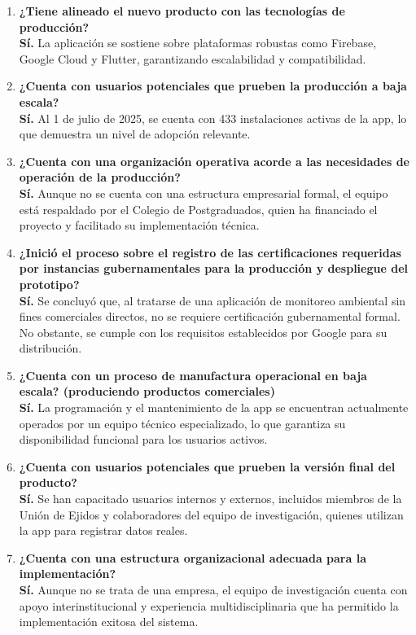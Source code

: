 \begin{enumerate}
\item \textbf{¿Tiene alineado el nuevo producto con las tecnologías de producción?} \\
\textbf{Sí.} La aplicación se sostiene sobre plataformas robustas como Firebase, Google Cloud y Flutter, garantizando escalabilidad y compatibilidad.

\item \textbf{¿Cuenta con usuarios potenciales que prueben la producción a baja escala?} \\
\textbf{Sí.} Al 1 de julio de 2025, se cuenta con 433 instalaciones activas de la app, lo que demuestra un nivel de adopción relevante.

\item \textbf{¿Cuenta con una organización operativa acorde a las necesidades de operación de la producción?} \\
\textbf{Sí.} Aunque no se cuenta con una estructura empresarial formal, el equipo está respaldado por el Colegio de Postgraduados, quien ha financiado el proyecto y facilitado su implementación técnica.
 

\item \textbf{¿Inició el proceso sobre el registro de las certificaciones requeridas por instancias gubernamentales para la producción y despliegue del prototipo?} \\
\textbf{Sí.} Se concluyó que, al tratarse de una aplicación de monitoreo ambiental sin fines comerciales directos, no se requiere certificación gubernamental formal. No obstante, se cumple con los requisitos establecidos por Google para su distribución.

\item \textbf{¿Cuenta con un proceso de manufactura operacional en baja escala? (produciendo productos comerciales)} \\
\textbf{Sí.} La programación y el mantenimiento de la app se encuentran actualmente operados por un equipo técnico especializado, lo que garantiza su disponibilidad funcional para los usuarios activos.

\item \textbf{¿Cuenta con usuarios potenciales que prueben la versión final del producto?} \\
\textbf{Sí.} Se han capacitado usuarios internos y externos, incluidos miembros de la Unión de Ejidos y colaboradores del equipo de investigación, quienes utilizan la app para registrar datos reales.

\item \textbf{¿Cuenta con una estructura organizacional adecuada para la implementación?} \\
\textbf{Sí.} Aunque no se trata de una empresa, el equipo de investigación cuenta con apoyo interinstitucional y experiencia multidisciplinaria que ha permitido la implementación exitosa del sistema.


\end{enumerate}
